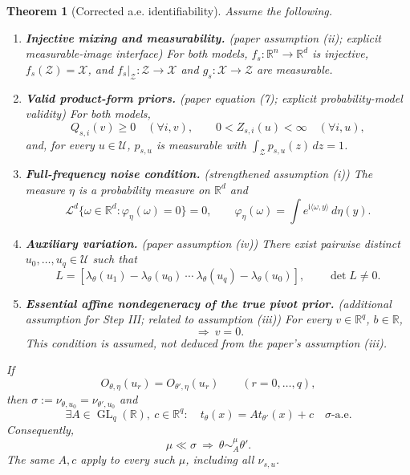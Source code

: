 \documentclass[11pt,a4paper]{article}
\newtheorem{theorem}{Theorem}
\newcommand{\R}{\mathbb R}
\newcommand{\Zset}{\mathcal Z}
\newcommand{\Xset}{\mathcal X}
\newcommand{\Uset}{\mathcal U}
\newcommand{\aev}{\text{-a.e.}}
\newcommand{\GL}{\operatorname{GL}}
\newcommand{\Leb}{\mathcal L}
\newcommand{\ip}[2]{\langle #1,#2\rangle}
\begin{document}
\begin{theorem}[Corrected a.e. identifiability]\label{thm:main}
Assume the following.
\begin{enumerate}[label=\textnormal{(\arabic*)},leftmargin=*,itemsep=4pt]
\item \textbf{Injective mixing and measurability.}
\textnormal{(paper assumption (ii); explicit measurable-image interface)}
For both models, $f_s:\R^n\to\R^d$ is injective,
$f_s(\Zset)=\Xset$, and $f_s|_{\Zset}:\Zset\to\Xset$ and
$g_s:\Xset\to\Zset$ are measurable.

\item \textbf{Valid product-form priors.}
\textnormal{(paper equation (7); explicit probability-model validity)}
For both models,
\[
 Q_{s,i}(v)\ge0\quad(\forall i,v),\qquad
 0<Z_{s,i}(u)<\infty\quad(\forall i,u),
\]
and, for every $u\in\Uset$, $p_{s,u}$ is measurable with
$\int_{\Zset}p_{s,u}(z)\,dz=1$.

\item \textbf{Full-frequency noise condition.}
\textnormal{(strengthened assumption (i))}
The measure $\eta$ is a probability measure on $\R^d$ and
\begin{equation}
 \Leb^d\{\omega\in\R^d:\varphi_\eta(\omega)=0\}=0,\qquad
 \varphi_\eta(\omega)=\int e^{\mathrm i\ip{\omega}{y}}\,d\eta(y).
 \label{eq:noise}
\end{equation}

\item \textbf{Auxiliary variation.}
\textnormal{(paper assumption (iv))}
There exist pairwise distinct $u_0,\ldots,u_q\in\Uset$ such that
\begin{equation}
 L=[\lambda_\theta(u_1)-\lambda_\theta(u_0)\ \cdots\
      \lambda_\theta(u_q)-\lambda_\theta(u_0)],\qquad \det L\ne0.
 \label{eq:L}
\end{equation}

\item \textbf{Essential affine nondegeneracy of the true pivot prior.}
\textnormal{(additional assumption for Step III; related to assumption (iii))}
For every $v\in\R^q$, $b\in\R$,
\begin{equation}
 [\,\ip{v}{T_\theta(z)}=b\quad P_{\theta,u_0}\aev\,]
 \ \Longrightarrow\ v=0. \label{eq:nd}
\end{equation}
This condition is assumed, not deduced from the paper's assumption (iii).
\end{enumerate}
If
\begin{equation}
 O_{\theta,\eta}(u_r)=O_{\theta',\eta}(u_r)
 \qquad(r=0,\ldots,q), \label{eq:hobs}
\end{equation}
then $\sigma:=\nu_{\theta,u_0}=\nu_{\theta',u_0}$ and
\begin{equation}
 \exists A\in\GL_q(\R),\ c\in\R^q:
 \quad t_\theta(x)=A t_{\theta'}(x)+c\quad\sigma\aev \label{eq:conclusion}
\end{equation}
Consequently,
\begin{equation}
 \mu\ll\sigma\ \Longrightarrow\ \theta\sim_A^\mu\theta'.
 \label{eq:equivalence}
\end{equation}
The same $A,c$ apply to every such $\mu$, including all $\nu_{s,u}$.
\end{theorem}
\end{document}

